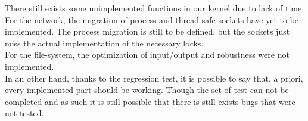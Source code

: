 There still exists some unimplemented functions in our kernel due to lack of
time.\\ 
For the network, the migration of process and thread safe sockets have
yet to be implemented. The process migration is still to be defined, but the
sockets just miss the actual implementation of the necessary locks.\\
For the file-system, the optimization of input/output and robustness were not
implemented.\\
In an other hand, thanks to the regression test, it is possible to say that, a
priori, every implemented part should be working. Though the set of test can
not be completed and as such it is still possible that there is still exists bugs
that were not tested.\\
